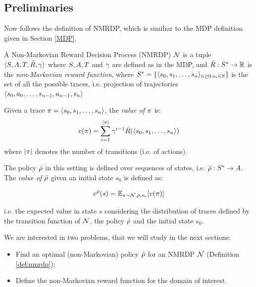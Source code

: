 \subsection{Preliminaries}
Now follows the definition of NMRDP, which is similiar to the MDP definition given in Section \ref{MDP}.

\begin{definition}\label{def:nmrdp}
	A Non-Markovian Reward Decision Process (NMRDP) \citep{bacchus1996rewarding} $\mathcal{N}$ is a tuple $\langle S, A, T, \bar{R}, \gamma \rangle$ where $S, A, T$ and $\gamma$ are defined as in the MDP, and $\bar{R} : S^* \to \mathbb{R}$ is the \emph{non-Markovian reward function}, where $S^* = \{\langle s_0, s_1, \dots, s_n \rangle_{n\ge0, s_i\in S}\}$ is the set of all the possible traces, i.e. projection of trajectories $\langle s_0, a_0, \dots, s_{n-1}, a_{n-1}, s_n \rangle$
	
\end{definition}

Given a trace $\pi = \langle s_0, s_1, \dots, s_n \rangle$, the \emph{value of $\pi$} is:
\begin{equation}
v(\pi) = \sum_{i=1}^{|\pi|} \gamma^{i-1}\bar{R}(\langle s_0, s_1, \dots, s_n \rangle)
\end{equation}
where $|\pi|$ denotes the number of transitions (i.e. of actions).

The policy $\bar{\rho}$ in this setting is defined over sequences of states, i.e. $\bar{\rho}: S^* \to A$. The \emph{value of $\bar{\rho}$} given an initial state $s_0$ is defined as:

\begin{equation}
v^{\bar{\rho}}(s) = \mathbb{E}_{\pi \sim \mathcal{N}, \bar{\rho}, s_0}[v(\pi)]
\end{equation}

i.e. the expected value in state $s$ considering the distribution of traces defined by the transition function of $\mathcal{N}$, the policy $\bar{\rho}$ and the initial state $s_0$.

We are interested in two problems, that we will study in the next sections:
\begin{itemize}
	\item Find an optimal (non-Markovian) policy $\bar{\rho}$ for an NMRDP $\mathcal{N}$ (Definition \ref{def:nmrdp});
	\item Define the non-Markovian reward function for the domain of interest.
\end{itemize}

